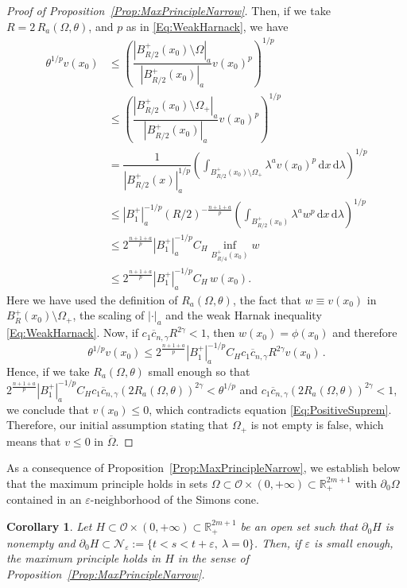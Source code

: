 \documentclass[12pt,reqno]{amsart}
\newtheorem{corollary}[theorem]{Corollary}
\theoremstyle{definition}
\theoremstyle{remark}
\newcommand{\con}[1]{\mathbb{#1}}
\newcommand{\R}{\con{R}} %
\newcommand{\ncal}{\mathcal{N}}
\newcommand{\ocal}{\mathcal{O}}
\newcommand{\s}{\gamma}
\renewcommand{\d}{\,\mathrm{d}} %
\numberwithin{equation}{section}
\begin{document}
\begin{proof}[Proof of Proposition~\ref{Prop:MaxPrincipleNarrow}]
Then, if we take $R = 2\,R_a(\Omega,\theta)$, and $p$ as in \eqref{Eq:WeakHarnack}, we have
\begin{align*}
\theta^{1/p} v(x_0) & \leq \left (  \dfrac{|B^+_{R/2}(x_0)\setminus  \Omega|_a}{|B^+_{R/2}(x_0)|_a}  v(x_0)^p \right)^{1/p} \\
& \leq \left (  \dfrac{|B^+_{R/2}(x_0)\setminus \Omega_+|_a}{|B^+_{R/2}(x_0)|_a}  v(x_0)^p \right)^{1/p} \\
&= \dfrac{1}{|B^+_{R/2}(x)|_a^{1/p}}  \left (  \int_{B^+_{R/2}(x_0)\setminus \Omega_+} \lambda ^a v(x_0)^p \d x \d \lambda  \right)^{1/p} \\
&\leq |B_1^+|_a^{-1/p} (R/2)^{- \frac{n+1+a}{p}} \left (  \int_{B^+_{R/2}(x_0)} \lambda ^a w^p \d x \d \lambda  \right)^{1/p} \\
&\leq 2^{\frac{n+1+a}{p}}|B_1^+|_a^{-1/p} C_H \inf_{B^+_{R/4}(x_0)} w \\
& \leq 2^{\frac{n+1+a}{p}}|B_1^+|_a^{-1/p} C_H \,  w(x_0).
\end{align*}
Here we have used the definition of $R_a(\Omega,\theta)$, the fact that $w \equiv v(x_0)$ in $B^+_R(x_0)\setminus\Omega_+$, the scaling of $|\cdot |_a$ and the weak Harnak inequality \eqref{Eq:WeakHarnack}. Now, if $c_1 \overline{c}_{n,\s} R^{2\s} < 1$, then $w(x_0) = \phi(x_0)$ and therefore
$$
\theta^{1/p} v(x_0) \leq  2^{\frac{n+1+a}{p}}|B_1^+|_a^{-1/p} C_H c_1 \overline{c}_{n,\s} R^{2\s} v(x_0)\,.
$$
Hence, if we take $R_a(\Omega,\theta)$ small enough so that $ 2^{\frac{n+1+a}{p}} |B_1^+|_a^{-1/p} C_H c_1 \overline{c}_{n,\s} (2 R_a(\Omega,\theta))^{2\s} < \theta^{1/p}$ and $c_1 \overline{c}_{n,\s} (2 R_a(\Omega,\theta))^{2\s} < 1$, we conclude that $v(x_0) \leq 0$, which contradicts equation \eqref{Eq:PositiveSuprem}. Therefore, our initial assumption stating that $\Omega_+$ is not empty is false, which means that $v\leq 0$ in $\overline{\Omega}$.
\end{proof}

As a consequence of Proposition~\ref{Prop:MaxPrincipleNarrow}, we establish below that the maximum principle holds in sets $\Omega \subset \ocal \times (0, +\infty) \subset \R^{2m+1}_+$ with $\partial_0 \Omega$ contained in an $\varepsilon$-neighborhood of the Simons cone.

\begin{corollary}
\label{Cor:MaxPrincipleNarrowSaddle}
Let $H\subset \ocal \times (0, +\infty) \subset \R^{2m + 1}_+$ be an open set such that $\partial_0 H$ is nonempty and $\partial_0 H \subset \ncal_\varepsilon := \{t < s < t+\varepsilon, \ \lambda= 0 \}$. Then, if $\varepsilon$ is small enough, the maximum principle holds in $H$ in the sense of Proposition~\ref{Prop:MaxPrincipleNarrow}.
\end{corollary}
\end{document}
